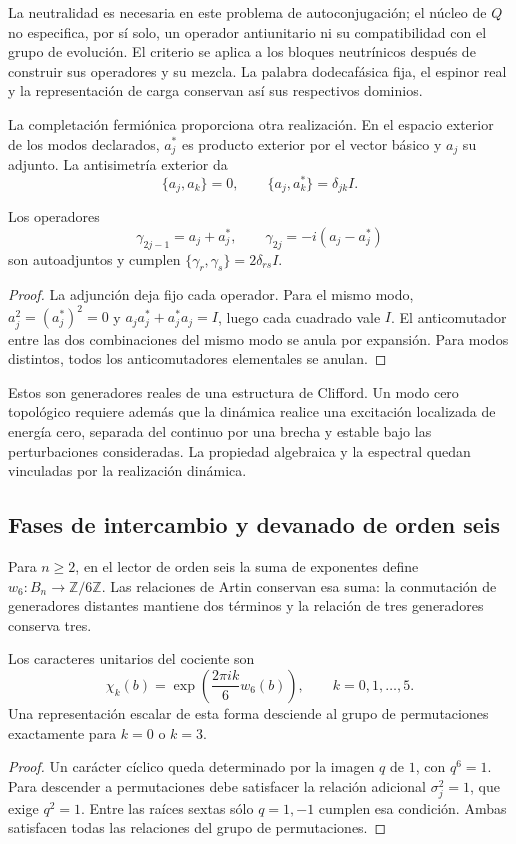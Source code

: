 La neutralidad es necesaria en este problema de autoconjugación;
el núcleo de $Q$ no especifica, por sí solo, un operador antiunitario
ni su compatibilidad con el grupo de evolución. El criterio se aplica a los
bloques neutrínicos después de construir sus operadores y su mezcla.
La palabra dodecafásica fija, el espinor real y la representación de
carga conservan así sus respectivos dominios.

La completación fermiónica proporciona otra realización. En el
espacio exterior de los modos declarados, $a_j^*$ es producto
exterior por el vector básico y $a_j$ su adjunto. La antisimetría
exterior da
\[
 \{a_j,a_k\}=0,\qquad \{a_j,a_k^*\}=\delta_{jk}I.
\]

\begin{proposition}
\label{vi:vi:prop:car-real}
Los operadores
\[
 \gamma_{2j-1}=a_j+a_j^*,\qquad
 \gamma_{2j}=-i(a_j-a_j^*)
\]
son autoadjuntos y cumplen $\{\gamma_r,\gamma_s\}=2\delta_{rs}I$.
\end{proposition}
\begin{proof}
La adjunción deja fijo cada operador. Para el mismo modo,
$a_j^2=(a_j^*)^2=0$ y $a_ja_j^*+a_j^*a_j=I$, luego cada
cuadrado vale $I$. El anticomutador entre las dos combinaciones
del mismo modo se anula por expansión. Para modos distintos,
todos los anticomutadores elementales se anulan.
\end{proof}

Estos son generadores reales de una estructura de Clifford. Un modo
cero topológico requiere además que la dinámica realice una excitación
localizada de energía cero, separada del continuo por una brecha y
estable bajo las perturbaciones consideradas. La propiedad algebraica
y la espectral quedan vinculadas por la realización dinámica.

\subsection{Fases de intercambio y devanado de orden seis}

Para \(n\ge2\), en el lector de orden seis la suma de exponentes define
$w_6:B_n\to\mathbb Z/6\mathbb Z$. Las relaciones de Artin
conservan esa suma: la conmutación de generadores distantes mantiene
dos términos y la relación de tres generadores conserva tres.

\begin{proposition}
\label{vi:vi:prop:devanado-seis}
Los caracteres unitarios del cociente son
\[
 \chi_k(b)=\exp\!\left(\frac{2\pi i k}{6}w_6(b)\right),
 \qquad k=0,1,\ldots,5.
\]
Una representación escalar de esta forma desciende al grupo de
permutaciones exactamente para $k=0$ o $k=3$.
\end{proposition}
\begin{proof}
Un carácter cíclico queda determinado por la imagen $q$ de $1$,
con $q^6=1$. Para descender a permutaciones debe satisfacer la
relación adicional $\sigma_j^2=1$, que exige $q^2=1$.
Entre las raíces sextas sólo $q=1,-1$ cumplen esa condición.
Ambas satisfacen todas las relaciones del grupo de permutaciones.
\end{proof}

